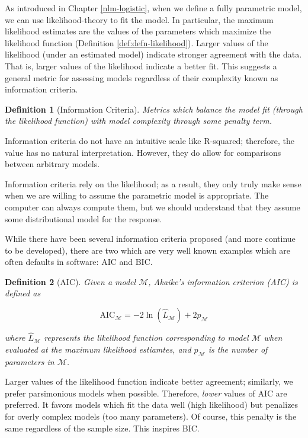 \documentclass[
]{book}
\theoremstyle{plain}
\theoremstyle{mydefn}
\newtheorem{definition}{Definition}[chapter]
\theoremstyle{myexmpl}
\theoremstyle{remark}
\begin{document}
As introduced in Chapter \ref{nlm-logistic}, when we define a fully parametric model, we can use likelihood-theory to fit the model. In particular, the maximum likelihood estimates are the values of the parameters which maximize the likelihood function (Definition \ref{def:defn-likelihood}). Larger values of the likelihood (under an estimated model) indicate stronger agreement with the data. That is, larger values of the likelihood indicate a better fit. This suggests a general metric for assessing models regardless of their complexity known as information criteria.

\begin{definition}[Information Criteria]
Metrics which balance the model fit (through the likelihood function) with model complexity through some penalty term.
\end{definition}

Information criteria do not have an intuitive scale like R-squared; therefore, the value has no natural interpretation. However, they do allow for comparisons between arbitrary models.

\begin{rmdwarning}
Information criteria rely on the likelihood; as a result, they only truly make sense when we are willing to assume the parametric model is appropriate. The computer can always compute them, but we should understand that they assume some distributional model for the response.
\end{rmdwarning}

While there have been several information criteria proposed (and more continue to be developed), there are two which are very well known examples which are often defaults in software: AIC and BIC.

\begin{definition}[AIC]
Given a model \(\mathcal{M}\), Akaike's information criterion (AIC) is defined as

\[\text{AIC}_{\mathcal{M}} = -2\ln\left(\widehat{L}_{\mathcal{M}}\right) + 2p_{\mathcal{M}}\]

where \(\widehat{L}_{\mathcal{M}}\) represents the likelihood function corresponding to model \(\mathcal{M}\) when evaluated at the maximum likelihood estiamtes, and \(p_{\mathcal{M}}\) is the number of parameters in \(\mathcal{M}\).
\end{definition}

Larger values of the likelihood function indicate better agreement; similarly, we prefer parsimonious models when possible. Therefore, \emph{lower} values of AIC are preferred. It favors models which fit the data well (high likelihood) but penalizes for overly complex models (too many parameters). Of course, this penalty is the same regardless of the sample size. This inspires BIC.
\end{document}
